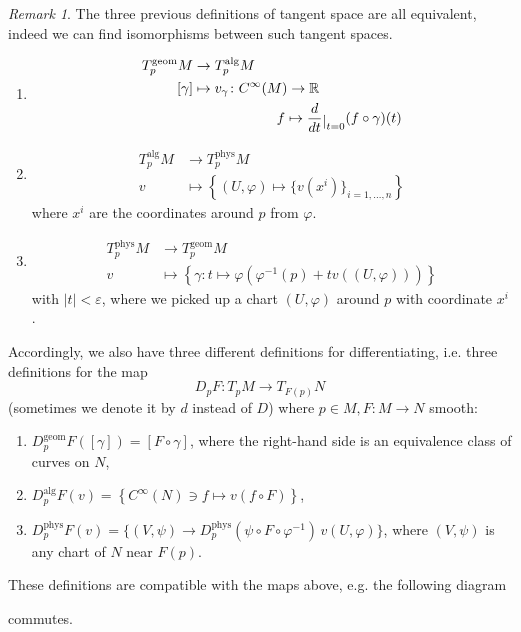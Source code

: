 \documentclass[a4paper,11pt,titlepage, article, oneside]{memoir}
\numberwithin{equation}{section}
\theoremstyle{definition}
\theoremstyle{remark}
\newtheorem{remark}[theorem]{Remark}
\newcommand{\rfield}{\mathbb{R}}
\newcommand{\restrict}[2]{{#1}\raisebox{-.5ex}{$|$}_{#2}}
\newcommand{\diondi}[1]{\frac{d}{d{#1}}}
\newcommand{\tangentgeom}[1]{T_{#1}^{\text{geom}}}
\newcommand{\tangentphys}[1]{T_{#1}^{\text{phys}}}
\newcommand{\tangentalg}[1]{T_{#1}^{\text{alg}}}
\begin{document}
\begin{remarkbox}\begin{remark} \label{equivremark}
The three previous definitions of tangent space are all equivalent, indeed we can find isomorphisms between such tangent spaces.
\begin{enumerate}
\item
\begin{align}
\tangentgeom{p}M &\rightarrow \tangentalg{p}M  \\
[\gamma] &\mapsto v_{\gamma}\colon C^{\infty}(M) \rightarrow \rfield \\
& \qquad \qquad \qquad f \mapsto \restrict{\diondi{t}}{t=0} (f\circ \gamma)(t)
\end{align}
\item
\begin{align}
\tangentalg{p}M &\rightarrow \tangentphys{p}M  \\
v &\mapsto \left \{ (U, \varphi) \mapsto\{v(x^i)\}_{i=1, \ldots, n} \right \}
\end{align}
where $x^i$ are the coordinates around $p$ from $\varphi$.
\item
\begin{align}
\tangentphys{p}M &\rightarrow \tangentgeom{p}M  \\
v &\mapsto \left\{ \gamma \colon t \mapsto \varphi(\varphi^{-1}(p) + tv((U, \varphi)))\right\}
\end{align}
with $|t| < \varepsilon$, where we picked up a chart $(U, \varphi)$ around $p$ with coordinate $x^i$.
\end{enumerate}
Accordingly, we also have three different definitions for differentiating, i.e. three definitions for the map
\begin{equation}
D_p F \colon T_pM \rightarrow T_{F(p)} N
\end{equation}
(sometimes we denote it by $d$ instead of $D$) where $p \in M, F \colon M \rightarrow N$ smooth:
\begin{enumerate}
\item $D_p^{\text{geom}} F ([\gamma]) = [F \circ \gamma]$, where the right-hand side is an equivalence class of curves on $N$,
\item $D_p^{\text{alg}} F (v) = \left \{C^{\infty}(N) \ni f \mapsto v(f \circ F) \right \}$,
\item $D_p^{\text{phys}} F(v) = \{ (V, \psi) \rightarrow D_p^{\text{phys}} (\psi \circ F \circ \varphi^{-1})\, v(U, \varphi)\}$, where $(V, \psi)$ is any chart of $N$ near $F(p)$.
\end{enumerate}
These definitions are compatible with the maps above, e.g. the following diagram
\begin{center}
\end{center}
commutes.
\end{remark}\end{remarkbox}
\end{document}

